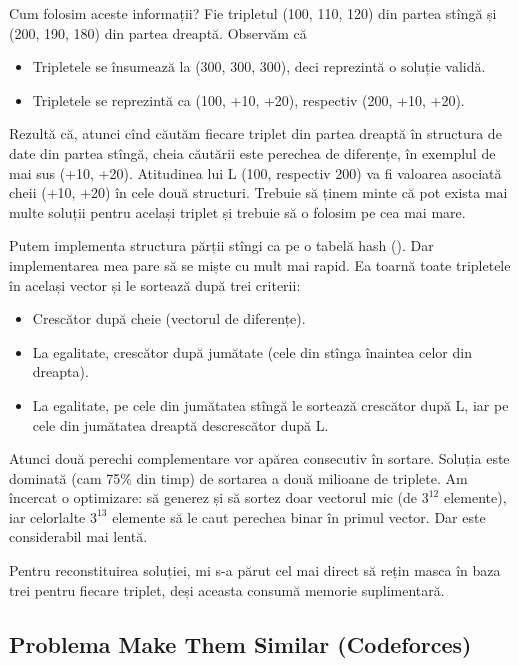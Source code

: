 \documentclass[../main.tex]{subfiles}
\begin{document}
Cum folosim aceste informații? Fie tripletul (100, 110, 120) din partea stîngă și (200, 190, 180) din partea dreaptă. Observăm că

\begin{itemize}
  \item Tripletele se însumează la (300, 300, 300), deci reprezintă o soluție validă.
  \item Tripletele se reprezintă ca (100, +10, +20), respectiv (200, +10, +20).
\end{itemize}

Rezultă că, atunci cînd căutăm fiecare triplet din partea dreaptă în structura de date din partea stîngă, cheia căutării este perechea de diferențe, în exemplul de mai sus (+10, +20). Atitudinea lui L (100, respectiv 200) va fi valoarea asociată cheii (+10, +20) în cele două structuri. Trebuie să ținem minte că pot exista mai multe soluții pentru același triplet și trebuie să o folosim pe cea mai mare.

Putem implementa structura părții stîngi ca pe o tabelă hash (). Dar implementarea mea pare să se miște cu mult mai rapid. Ea toarnă toate tripletele în același vector și le sortează după trei criterii:

\begin{itemize}
  \item Crescător după cheie (vectorul de diferențe).
  \item La egalitate, crescător după jumătate (cele din stînga înaintea celor din dreapta).
  \item La egalitate, pe cele din jumătatea stîngă le sortează crescător după L, iar pe cele din jumătatea dreaptă descrescător după L.
\end{itemize}

Atunci două perechi complementare vor apărea consecutiv în sortare. Soluția este dominată (cam 75\% din timp) de sortarea a două milioane de triplete. Am încercat o optimizare: să generez și să sortez doar vectorul mic (de $3^{12}$ elemente), iar celorlalte $3^{13}$ elemente să le caut perechea binar în primul vector. Dar este considerabil mai lentă.

Pentru reconstituirea soluției, mi s-a părut cel mai direct să rețin masca în baza trei pentru fiecare triplet, deși aceasta consumă memorie suplimentară.


\subsection{Problema Make Them Similar (Codeforces)}
\label{problem:make-them-similar}
\end{document}
